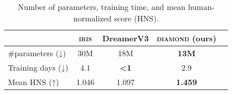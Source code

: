 \begin{table}[h]
\caption{Number of parameters, training time, and mean human-normalized score (HNS).}
\label{tab:training_time}
\begin{center}
\begin{tabular}{lcccc}
\hline
    & \textsc{iris} & DreamerV3 & \textsc{diamond} (ours) & \\ \hline
\#parameters (↓)        & 30M       & 18M            & \textbf{13M}   &  \\
Training days (↓) & 4.1       & \textbf{\textless 1}   & 2.9   &  \\
Mean HNS (↑)            & 1.046     & 1.097          & \textbf{1.459} &  \\ \hline
\end{tabular}
\end{center}
\end{table}

